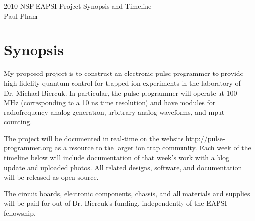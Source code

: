 \documentclass{article}
\begin{document}
\thispagestyle{empty}           %

\begin{center}
\LARGE{2010 NSF EAPSI Project Synopsis and Timeline}\\
\Large{Paul Pham}
\end{center}

\section{Synopsis}

My proposed project is to construct an electronic pulse programmer to
provide high-fidelity quantum control for trapped ion experiments in
the laboratory of Dr. Michael Biercuk. In particular, the pulse programmer will
operate
at 100 MHz (corresponding to a 10 ns time resolution) and have modules
for radiofrequency analog generation, arbitrary analog waveforms, and
input counting.

The project will be documented in real-time on the website
http://pulse-programmer.org as a resource to the larger ion trap community.
Each week of the timeline
below will include documentation of that week's work with a blog update and
uploaded photos.
All related designs, software, and documentation will be released as
open source.

The circuit boards, electronic components, chassis, and all materials and
supplies will be paid for out of Dr. Biercuk's funding, independently of the
EAPSI fellowship.
\end{document}
